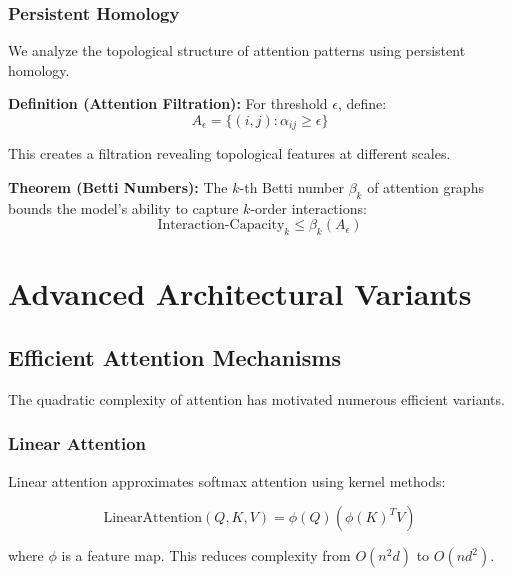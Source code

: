 \documentclass[11pt]{article}
\begin{document}
\subsubsection{Persistent Homology}

We analyze the topological structure of attention patterns using persistent homology.

\textbf{Definition (Attention Filtration):} For threshold $\epsilon$, define:
\begin{equation}
A_\epsilon = \{(i,j) : \alpha_{ij} \geq \epsilon\}
\end{equation}

This creates a filtration revealing topological features at different scales.

\textbf{Theorem (Betti Numbers):} The $k$-th Betti number $\beta_k$ of attention graphs bounds the model's ability to capture $k$-order interactions:
\begin{equation}
\text{Interaction-Capacity}_k \leq \beta_k(A_\epsilon)
\end{equation}

\section{Advanced Architectural Variants}

\subsection{Efficient Attention Mechanisms}

The quadratic complexity of attention has motivated numerous efficient variants.

\subsubsection{Linear Attention}

Linear attention approximates softmax attention using kernel methods:

\begin{equation}
\text{LinearAttention}(Q, K, V) = \phi(Q)(\phi(K)^T V)
\end{equation}

where $\phi$ is a feature map. This reduces complexity from $O(n^2d)$ to $O(nd^2)$.
\end{document}
